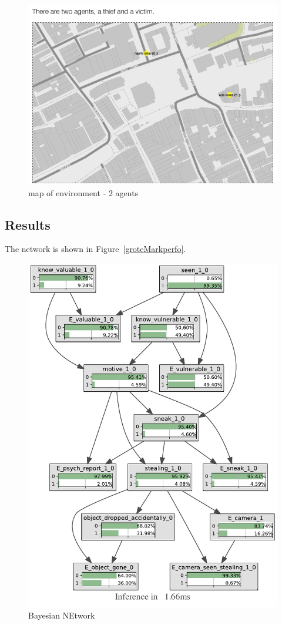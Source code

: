 \begin{figure}[htbp]
\begin{center}
\includegraphics[width=\linewidth]{images/grotemarktmap.png}
\caption{map of environment - 2 agents}
\label{groteMarkt}
\end{center}
\end{figure}



\subsection{Results}

The network is shown in Figure~\ref{groteMarkperfo}.
\begin{figure}[htbp]
\begin{center}
\includegraphics[width=.7\linewidth]{../experiments/GroteMarkt/bnImage/BNIMAGEGroteMarkt.pdf}
\caption{Bayesian NEtwork}
\label{groteMarktperfo}
\end{center}
\end{figure}

